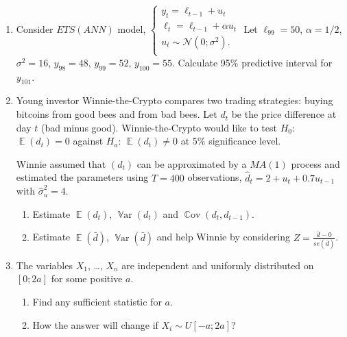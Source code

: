 \documentclass[12pt]{article}
\DeclareMathOperator{\Cov}{\mathbb{C}ov}
\DeclareMathOperator{\Var}{\mathbb{V}ar}
\DeclareMathOperator{\E}{\mathbb{E}}
\newcommand \cN{\mathcal{N}}
\begin{document}


\begin{enumerate}

\item Consider $ETS(ANN)$ model,
	$
	\begin{cases}
	y_t = \ell_{t-1} + u_t \\
	\ell_t = \ell_{t-1} + \alpha u_t \\
	u_t \sim \cN(0;\sigma^2). \\
	\end{cases}
	$
Let $\ell_{99} = 50$, $\alpha = 1/2$, $\sigma^2 = 16$, $y_{98} = 48$, $y_{99} = 52$, $y_{100} = 55$. Calculate 95\% predictive interval for $y_{101}$.

\item Young investor Winnie-the-Crypto compares two trading strategies: buying bitcoins from good bees and from bad bees. 
Let $d_t$ be the price difference at day $t$ (bad minus good). 
Winnie-the-Crypto would like to test $H_0$: $\E(d_t) = 0$ against $H_a$: $\E(d_t) \neq 0$ at $5\%$ significance level.

Winnie assumed that $(d_t)$ can be approximated by a $MA(1)$ process and estimated the parameters using $T=400$ observations, $\hat d_t = 2 + u_t + 0.7 u_{t-1}$ 
with $\hat\sigma^2_u = 4$.

\begin{enumerate}
	\item Estimate $\E(d_t)$, $\Var(d_t)$ and $\Cov(d_t, d_{t-1})$.
	\item Estimate $\E(\bar d)$, $\Var(\bar d)$ and help Winnie by considering $Z = \frac{\bar d - 0}{se(\bar d)}$.
\end{enumerate}



\item The variables $X_1$, \ldots, $X_n$ are independent and uniformly distributed on $[0; 2a]$ for some positive $a$. 

\begin{enumerate}
	\item Find any sufficient statistic for $a$. 
	\item How the answer will change if $X_i \sim U[-a; 2a]$?
\end{enumerate}


\end{enumerate}
\end{document}
